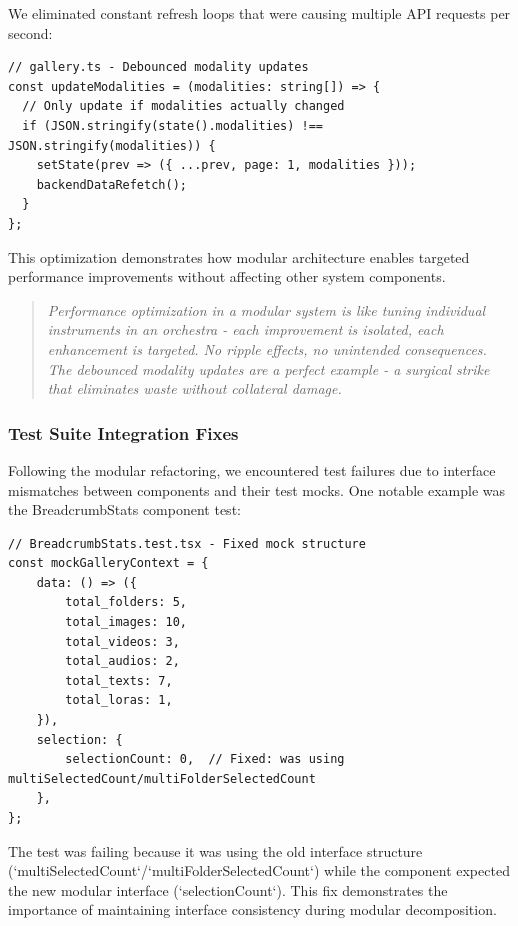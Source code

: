 \documentclass[11pt]{article}
\begin{document}
We eliminated constant refresh loops that were causing multiple API requests per second:

\begin{lstlisting}[style=typescript]
// gallery.ts - Debounced modality updates
const updateModalities = (modalities: string[]) => {
  // Only update if modalities actually changed
  if (JSON.stringify(state().modalities) !== JSON.stringify(modalities)) {
    setState(prev => ({ ...prev, page: 1, modalities }));
    backendDataRefetch();
  }
};
\end{lstlisting}

This optimization demonstrates how modular architecture enables targeted performance improvements without affecting other system components.

\begin{quote}
\emph{Performance optimization in a modular system is like tuning individual instruments in an orchestra - each improvement is isolated, each enhancement is targeted. No ripple effects, no unintended consequences. The debounced modality updates are a perfect example - a surgical strike that eliminates waste without collateral damage.}
\end{quote}

\subsubsection{Test Suite Integration Fixes}

Following the modular refactoring, we encountered test failures due to interface mismatches between components and their test mocks. One notable example was the BreadcrumbStats component test:

\begin{lstlisting}[style=typescript]
// BreadcrumbStats.test.tsx - Fixed mock structure
const mockGalleryContext = {
    data: () => ({
        total_folders: 5,
        total_images: 10,
        total_videos: 3,
        total_audios: 2,
        total_texts: 7,
        total_loras: 1,
    }),
    selection: {
        selectionCount: 0,  // Fixed: was using multiSelectedCount/multiFolderSelectedCount
    },
};
\end{lstlisting}

The test was failing because it was using the old interface structure 
(`multiSelectedCount`/`multiFolderSelectedCount`) while the component expected the new 
modular interface (`selectionCount`). This fix demonstrates the importance of maintaining 
interface consistency during modular decomposition.
\end{document}
